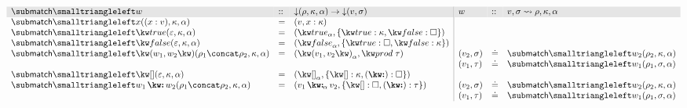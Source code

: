 $\begin{array}{lll|lll}
   \arrayrulecolor{lightgray}
   \rowcolor{verylightgray}
   \matchBwdF{w} &::& \Below{(\rho,\kappa, \alpha)} \to \Below{(v,\sigma)}
   &w &::& v, \sigma \match \rho, \kappa, \alpha
   \\
   \matchBwdF{\matchVar{x}}(\bind{x}{v}, \kappa, \alpha)
   &=&
   (v, \elimVar{x}{\kappa})
   \\
   \matchBwdF{\matchTrue}(\seqEmpty, \kappa, \alpha)
   &=&
   (\annTrue{\alpha}, \elimBool{\kappa}{\hole})
   \\
   \matchBwdF{\matchFalse}(\seqEmpty, \kappa, \alpha)
   &=&
   (\annFalse{\alpha}, \elimBool{\hole}{\kappa})
   \\
   \matchBwdF{\matchPair{w_1}{w_2}}(\rho_1 \concat \rho_2, \kappa, \alpha)
   &=&
   (\annPair{v_1}{v_2}{\alpha}, \elimProd{\tau})
   &
   (v_2, \sigma) &\eq& \matchBwdF{w_2}(\rho_2, \kappa, \alpha)
   \\
   &&&
   (v_1, \tau) &\eq& \matchBwdF{w_1}(\rho_1, \sigma, \alpha)
   \\
   \matchBwdF{\matchNil}(\seqEmpty,\kappa,\alpha)
   &=&
   (\annNil{\alpha}, \elimList{\kappa}{\hole})
   \\
   \matchBwdF{\matchCons{w_1}{w_2}}(\rho_1 \concat \rho_2, \kappa, \alpha)
   &=&
   (\annCons{v_1}{v_2}{\alpha}, \elimList{\hole}{\tau})
   &
   (v_2, \sigma) &\eq& \matchBwdF{w_2}(\rho_2, \kappa, \alpha)
   \\
   &&&
   (v_1, \tau) &\eq& \matchBwdF{w_1}(\rho_1, \sigma, \alpha)
\end{array}$\\
